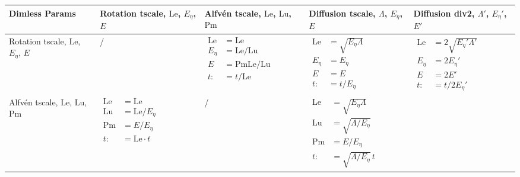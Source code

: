\begin{table}[htbp]
\centering
\begin{tabular}[c]{p{2.5cm}|p{2.5cm}|p{2.5cm}|p{2.5cm}|p{2.5cm}}
    \toprule
    Dimless Params & Rotation tscale, $\mathrm{Le}$, $E_\eta$, $E$ & Alfvén tscale, $\mathrm{Le}$, $\mathrm{Lu}$, $\mathrm{Pm}$ & Diffusion tscale, $\Lambda$, $E_\eta$, $E$ & Diffusion div2, $\Lambda'$, $E_\eta'$, $E'$ \\
    \hline
    Rotation tscale, $\mathrm{Le}$, $E_\eta$, $E$ & / 
    & $\begin{aligned}
        \mathrm{Le} &= \mathrm{Le} \\ 
        E_\eta &= \mathrm{Le} / \mathrm{Lu} \\ 
        E &= \mathrm{Pm} \mathrm{Le} / \mathrm{Lu} \\
        t :&= t / \mathrm{Le} 
    \end{aligned}$
    & $\begin{aligned}
        \mathrm{Le} &= \sqrt{E_\eta \Lambda} \\ 
        E_\eta &= E_\eta \\ 
        E &= E \\
        t :&= t / E_\eta
    \end{aligned}$
    & $\begin{aligned}
        \mathrm{Le} &= 2\sqrt{E_\eta' \Lambda'} \\ 
        E_\eta &= 2E_\eta' \\ 
        E &= 2E' \\
        t :&= t / 2E_\eta'
    \end{aligned}$ \\
    \hline
    Alfvén tscale, $\mathrm{Le}$, $\mathrm{Lu}$, $\mathrm{Pm}$ 
    & $\begin{aligned}
        \mathrm{Le} &= \mathrm{Le} \\ 
        \mathrm{Lu} &= \mathrm{Le} / E_\eta \\ 
        \mathrm{Pm} &= E/E_\eta \\ 
        t :&= \mathrm{Le} \cdot t
    \end{aligned}$ & /
    & $\begin{aligned}
        \mathrm{Le} &= \sqrt{E_\eta \Lambda} \\ 
        \mathrm{Lu} &= \sqrt{\Lambda / E_\eta} \\ 
        \mathrm{Pm} &= E/E_\eta \\
        t :&= \sqrt{\Lambda / E_\eta} \, t
    \end{aligned}$ 

\end{tabular}
\end{table}
